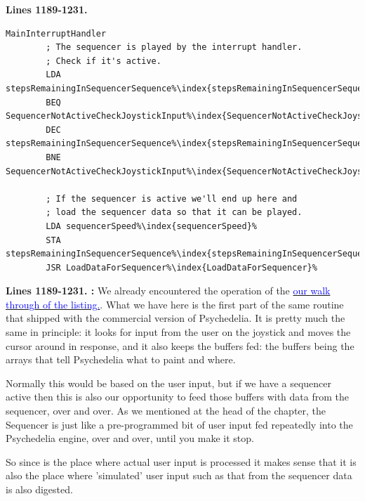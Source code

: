 \clearpage


\textbf{Lines 1189-1231. }
\begin{lstlisting}[escapechar=\%]
MainInterruptHandler
        ; The sequencer is played by the interrupt handler.
        ; Check if it's active.
        LDA stepsRemainingInSequencerSequence%\index{stepsRemainingInSequencerSequence}%
        BEQ SequencerNotActiveCheckJoystickInput%\index{SequencerNotActiveCheckJoystickInput}%
        DEC stepsRemainingInSequencerSequence%\index{stepsRemainingInSequencerSequence}%
        BNE SequencerNotActiveCheckJoystickInput%\index{SequencerNotActiveCheckJoystickInput}%

        ; If the sequencer is active we'll end up here and
        ; load the sequencer data so that it can be played.
        LDA sequencerSpeed%\index{sequencerSpeed}%
        STA stepsRemainingInSequencerSequence%\index{stepsRemainingInSequencerSequence}%
        JSR LoadDataForSequencer%\index{LoadDataForSequencer}%
\end{lstlisting}

\clearpage

\textbf{Lines 1189-1231. :} We already encountered the operation of the  
\hyperref[sec:listing_commentary]{\textcolor{blue}{ our walk through of the listing.}}. What we have here is the first part of the same routine
that shipped with the commercial version of Psychedelia. It is pretty much the same in principle: it looks for input from the user on the joystick
and moves the cursor around in response, and it also keeps the buffers fed: the buffers being the arrays that tell Psychedelia what to paint and where.

Normally this would be based on the user input, but if we have a sequencer active then this is also our opportunity to feed those buffers with data from 
the sequencer, over and over. As we mentioned at the head of the chapter, the Sequencer is just like a pre-programmed bit of user input fed repeatedly
into the Psychedelia engine, over and over, until you make it stop. 

So since  is the place where actual user input is processed it makes sense that it is also the place where 'simulated' user
input such as that from the sequencer data is also digested.

